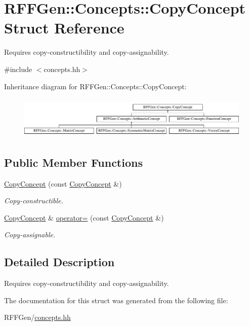 \hypertarget{structRFFGen_1_1Concepts_1_1CopyConcept}{\section{R\-F\-F\-Gen\-:\-:Concepts\-:\-:Copy\-Concept Struct Reference}
\label{structRFFGen_1_1Concepts_1_1CopyConcept}
}


Requires copy-\/constructibility and copy-\/assignability.  




{\ttfamily \#include $<$concepts.\-hh$>$}

Inheritance diagram for R\-F\-F\-Gen\-:\-:Concepts\-:\-:Copy\-Concept\-:\begin{figure}[H]
\begin{center}
\leavevmode
\includegraphics[height=2.058824cm]{structRFFGen_1_1Concepts_1_1CopyConcept}
\end{center}
\end{figure}
\subsection*{Public Member Functions}
\begin{DoxyCompactItemize}
\item 
\hypertarget{structRFFGen_1_1Concepts_1_1CopyConcept_a8c65652314ce23b53ff82ff5c1e6d7a2}{\hyperlink{structRFFGen_1_1Concepts_1_1CopyConcept_a8c65652314ce23b53ff82ff5c1e6d7a2}{Copy\-Concept} (const \hyperlink{structRFFGen_1_1Concepts_1_1CopyConcept}{Copy\-Concept} \&)}\label{structRFFGen_1_1Concepts_1_1CopyConcept_a8c65652314ce23b53ff82ff5c1e6d7a2}

\begin{DoxyCompactList}\small\item\em Copy-\/constructible. \end{DoxyCompactList}\item 
\hypertarget{structRFFGen_1_1Concepts_1_1CopyConcept_a14e42cfa42f78c5142bd51b24e9056bc}{\hyperlink{structRFFGen_1_1Concepts_1_1CopyConcept}{Copy\-Concept} \& \hyperlink{structRFFGen_1_1Concepts_1_1CopyConcept_a14e42cfa42f78c5142bd51b24e9056bc}{operator=} (const \hyperlink{structRFFGen_1_1Concepts_1_1CopyConcept}{Copy\-Concept} \&)}\label{structRFFGen_1_1Concepts_1_1CopyConcept_a14e42cfa42f78c5142bd51b24e9056bc}

\begin{DoxyCompactList}\small\item\em Copy-\/assignable. \end{DoxyCompactList}\end{DoxyCompactItemize}


\subsection{Detailed Description}
Requires copy-\/constructibility and copy-\/assignability. 

The documentation for this struct was generated from the following file\-:\begin{DoxyCompactItemize}
\item 
R\-F\-F\-Gen/\hyperlink{concepts_8hh}{concepts.\-hh}\end{DoxyCompactItemize}
